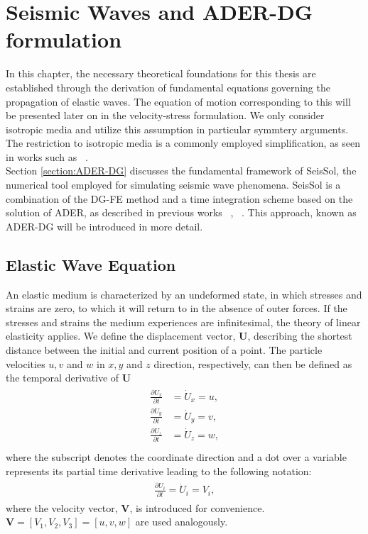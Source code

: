 
\chapter{Seismic Waves and ADER-DG formulation}\label{chapter:seismicwaves}
In this chapter, the necessary theoretical foundations for this thesis are established through the derivation of fundamental equations governing the propagation of elastic waves.
The equation of motion corresponding to this will be presented later on in the velocity-stress formulation.
We only consider isotropic media and utilize this assumption in particular symmtery arguments. The restriction to isotropic media is a commonly employed simplification, as seen in works such as ~\parencite{dumbser1}. \\

Section \ref{section:ADER-DG} discusses the fundamental framework of SeisSol, the numerical tool employed for simulating seismic wave phenomena. SeisSol is a combination
of the \ac{DG-FE} method and a time integration scheme based on the solution of \ac{ADER}, as described in previous works ~\parencite{dumbser1}, ~\parencite{seissol}. This approach, known as 
\ac{ADER}-\ac{DG} will be introduced in more detail.

\section{Elastic Wave Equation}\label{section:elasticwaveequation}
An elastic medium is characterized by an undeformed state, in which stresses and strains are zero, to which it will return to in the absence
of outer forces. If the stresses and strains the medium experiences are infinitesimal, the theory of linear elasticity applies. We define
the displacement vector, $\mathbf{U}$, describing the shortest distance between the initial and current position of a point. The particle
velocities $u,v$ and $w$ in $x, y$ and $z$ direction, respectively, can then be defined as the temporal derivative of $\mathbf{U}$
\begin{align}
    \begin{split}
    \frac{\partial U_x}{\partial t} &= \dot{U}_x = u, \\
    \frac{\partial U_y}{\partial t} &= \dot{U}_y = v, \\
    \frac{\partial U_z}{\partial t} &= \dot{U}_z = w, \\
    \end{split}
 \end{align}
where the subscript denotes the coordinate direction and a dot over a variable represents its partial time derivative leading to the following notation:
\begin{align}
    \begin{split}
        \frac{\partial U_i}{\partial t} = \dot{U}_i = V_i,
    \end{split}
    \label{equation1}
\end{align}
where the velocity vector, $\mathbf{V}$, is introduced for convenience. $\mathbf{V} = [V_1, V_2, V_3] = [u, v ,w]$ are used analogously.\\

